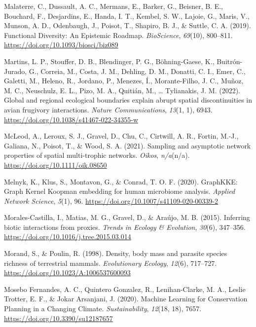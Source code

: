 \documentclass[11pt]{article}
\newlength{\cslhangindent}
\newenvironment{CSLReferences}[2] %
 {%
  \setlength{\parindent}{0pt}
  \ifodd #1 \everypar{\setlength{\hangindent}{\cslhangindent}}\ignorespaces\fi
  \ifnum #2 > 0
  \setlength{\parskip}{#2\baselineskip}
  \fi
 }%
 {}
\begin{document}
\begin{CSLReferences}{1}{0}
\leavevmode{}%
Malaterre, C., Dussault, A. C., Mermans, E., Barker, G., Beisner, B. E.,
Bouchard, F., Desjardins, E., Handa, I. T., Kembel, S. W., Lajoie, G.,
Maris, V., Munson, A. D., Odenbaugh, J., Poisot, T., Shapiro, B. J., \&
Suttle, C. A. (2019). Functional Diversity: An Epistemic Roadmap.
\emph{BioScience}, \emph{69}(10), 800--811.
\url{https://doi.org/10.1093/biosci/biz089}

\leavevmode{}%
Martins, L. P., Stouffer, D. B., Blendinger, P. G., Böhning-Gaese, K.,
Buitrón-Jurado, G., Correia, M., Costa, J. M., Dehling, D. M., Donatti,
C. I., Emer, C., Galetti, M., Heleno, R., Jordano, P., Menezes, Í.,
Morante-Filho, J. C., Muñoz, M. C., Neuschulz, E. L., Pizo, M. A.,
Quitián, M., \ldots{} Tylianakis, J. M. (2022). Global and regional
ecological boundaries explain abrupt spatial discontinuities in avian
frugivory interactions. \emph{Nature Communications}, \emph{13}(1, 1),
6943. \url{https://doi.org/10.1038/s41467-022-34355-w}

\leavevmode{}%
McLeod, A., Leroux, S. J., Gravel, D., Chu, C., Cirtwill, A. R., Fortin,
M.-J., Galiana, N., Poisot, T., \& Wood, S. A. (2021). Sampling and
asymptotic network properties of spatial multi-trophic networks.
\emph{Oikos}, \emph{n/a}(n/a). \url{https://doi.org/10.1111/oik.08650}

\leavevmode{}%
Melnyk, K., Klus, S., Montavon, G., \& Conrad, T. O. F. (2020).
GraphKKE: Graph Kernel Koopman embedding for human microbiome analysis.
\emph{Applied Network Science}, \emph{5}(1), 96.
\url{https://doi.org/10.1007/s41109-020-00339-2}

\leavevmode{}%
Morales-Castilla, I., Matias, M. G., Gravel, D., \& Araújo, M. B.
(2015). Inferring biotic interactions from proxies. \emph{Trends in
Ecology \& Evolution}, \emph{30}(6), 347--356.
\url{https://doi.org/10.1016/j.tree.2015.03.014}

\leavevmode{}%
Morand, S., \& Poulin, R. (1998). Density, body mass and parasite
species richness of terrestrial mammals. \emph{Evolutionary Ecology},
\emph{12}(6), 717--727. \url{https://doi.org/10.1023/A:1006537600093}

\leavevmode{}%
Mosebo Fernandes, A. C., Quintero Gonzalez, R., Lenihan-Clarke, M. A.,
Leslie Trotter, E. F., \& Jokar Arsanjani, J. (2020). Machine Learning
for Conservation Planning in a Changing Climate. \emph{Sustainability},
\emph{12}(18, 18), 7657. \url{https://doi.org/10.3390/su12187657}


\end{CSLReferences}
\end{document}
